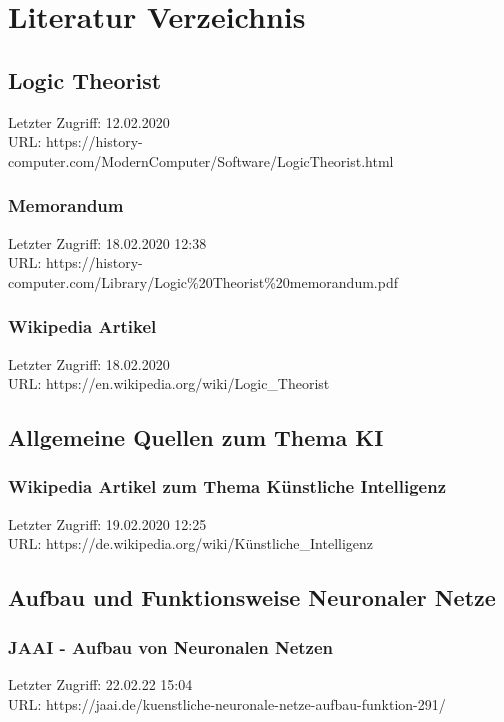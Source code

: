 \section{Literatur Verzeichnis}
\label{sec:literatur}

\subsection{Logic Theorist}
\label{bib:LogicTheorist}
	Letzter Zugriff: 12.02.2020\\
	URL: https://history-computer.com/ModernComputer/Software/LogicTheorist.html

	\subsubsection{Memorandum}
	\label{LogicTheorist:Memorandum}
		Letzter Zugriff: 18.02.2020 12:38\\
		URL: https://history-computer.com/Library/Logic\%20Theorist\%20memorandum.pdf
		
	\subsubsection{Wikipedia Artikel}
	\label{LogicTheorist:Wikipedia}
	Letzter Zugriff: 18.02.2020\\
	URL: https://en.wikipedia.org/wiki/Logic\_Theorist

\subsection{Allgemeine Quellen zum Thema KI}
\label{bib:AllgeimeineQuellen}
		\subsubsection{Wikipedia Artikel zum Thema Künstliche Intelligenz}
		\label{wiki:KuenstlicheIntelligenz}
		Letzter Zugriff: 19.02.2020 12:25\\
		URL: https://de.wikipedia.org/wiki/Künstliche\_Intelligenz
	
\subsection{Aufbau und Funktionsweise Neuronaler Netze}		
\label{subsec:Aufbau_Funktion_Neuronaler_Netze}
		\subsubsection{JAAI - Aufbau von Neuronalen Netzen}
		\label{subsubsec:Aufbau_von_Neuronalen_Netzen}
		Letzter Zugriff: 22.02.22 15:04\\
		URL: https://jaai.de/kuenstliche-neuronale-netze-aufbau-funktion-291/

